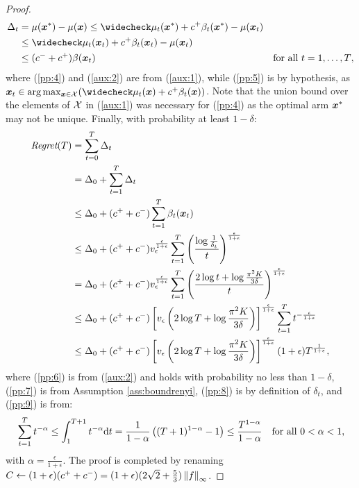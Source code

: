 \documentclass{article}
\begin{document}
\begin{proof}
\begin{align}
		\Delta_t &= \mu(\vx^*) - \mu(\vx) \leq 
		\wc{\mu_t}(\vx^*) + c^{+}\beta_t(\vx^*) - \mu(\vx_t) \label{pp:4}\\
		&\leq \wc{\mu_t}(\vx_t) + c^{+}\beta_t(\vx_t) - \mu(\vx_t) \label{pp:5}\\
		&\leq (c^{-} + c^{+})\beta(\vx_t) & \text{for all $t=1,\dots,T$}\label{aux:2}, 
	\end{align}
	where (\ref{pp:4}) and (\ref{aux:2}) are from (\ref{aux:1}), while (\ref{pp:5}) is by hypothesis, as $\vx_t \in \arg\max_{\vx\in\Xspace}(\wc{\mu_t}(\vx) + c^{+}\beta_t(\vx))$.
	Note that the union bound over the elements of $\Xspace$ in (\ref{aux:1}) was necessary for (\ref{pp:4}) as the optimal arm $\vx^*$ may not be unique.
	Finally, with probability at least $1-\delta$:
	\begin{align}
		\Reg(T) &= \sum_{t=0}^{T}\Delta_t \nonumber\\
		&= \Delta_0  + \sum_{t=1}^{T}\Delta_t \nonumber\\
		&\leq \Delta_0  + (c^{+}+c^{-})\sum_{t=1}^{T}\beta_t(\vx_t) \label{pp:6}\\
		&\leq \Delta_0  + (c^{+}+c^{-})v_{\epsilon}^{\frac{\epsilon}{1+\epsilon}}\sum_{t=1}^{T}\left(\frac{\log\frac{1}{\delta_t}}{t}\right)^{\frac{\epsilon}{1+\epsilon}} \label{pp:7}\\
		&=\Delta_0  + (c^{+}+c^{-})v_{\epsilon}^{\frac{\epsilon}{1+\epsilon}}\sum_{t=1}^{T}\left(\frac{2\log t + \log\frac{\pi^2K}{3\delta}}{t}\right)^{\frac{\epsilon}{1+\epsilon}} \label{pp:8}\\
		&\leq \Delta_0  + (c^{+}+c^{-})\left[v_{\epsilon}\left(2\log T + \log\frac{\pi^2K}{3\delta}\right)\right]^{\frac{\epsilon}{1+\epsilon}}\sum_{t=1}^{T}t^{-\frac{\epsilon}{1+\epsilon}} \nonumber\\
		&\leq \Delta_0  + (c^{+}+c^{-})\left[v_{\epsilon}\left(2\log T + \log\frac{\pi^2K}{3\delta}\right)\right]^{\frac{\epsilon}{1+\epsilon}}(1+\epsilon)T^{\frac{1}{1+\epsilon}} \label{pp:9},
	\end{align}
	where (\ref{pp:6}) is from (\ref{aux:2}) and holds with probability no less than $1-\delta$, (\ref{pp:7}) is from Assumption \ref{ass:boundrenyi}, (\ref{pp:8}) is by definition of $\delta_t$, and (\ref{pp:9}) is from: 
	\begin{align}\label{aux:3}
		&\sum_{t=1}^{T}t^{-\alpha} \leq \int_{1}^{T+1}t^{-\alpha}\de t
		= \frac{1}{1-\alpha}\left((T+1)^{1-\alpha} - 1\right) \leq \frac{T^{1-\alpha}}{1-\alpha} &\text{for all $0<\alpha<1$},
	\end{align}
	with $\alpha=\frac{\epsilon}{1+\epsilon}$.
	The proof is completed by renaming $C\gets (1+\epsilon)(c^{+}+c^{-}) = (1+\epsilon)(2\sqrt{2} + \frac{5}{3})\norm[\infty]{f}$.
\end{proof}
\end{document}
